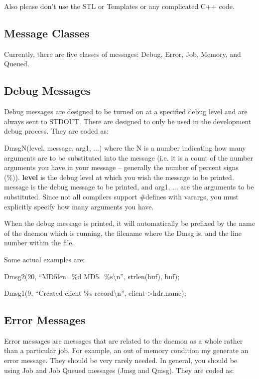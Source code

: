 Also please don't use the STL or Templates or any complicated C++ code. 

\subsection{Message Classes}

Currently, there are five classes of messages: Debug, Error, Job, Memory, 
and Queued.

\subsection{Debug Messages}

Debug messages are designed to be turned on at a specified debug level and are
always sent to STDOUT. There are designed to only be used in the development
debug process. They are coded as: 

DmsgN(level, message, arg1, ...) where the N is a number indicating how many
arguments are to be substituted into the message (i.e. it is a count of the
number arguments you have in your message -- generally the number of percent
signs (\%)). {\bf level} is the debug level at which you wish the message to
be printed. message is the debug message to be printed, and arg1, ... are the
arguments to be substituted. Since not all compilers support \#defines with
varargs, you must explicitly specify how many arguments you have. 

When the debug message is printed, it will automatically be prefixed by the
name of the daemon which is running, the filename where the Dmsg is, and the
line number within the file. 

Some actual examples are: 

Dmsg2(20, ``MD5len=\%d MD5=\%s\textbackslash{}n'', strlen(buf), buf); 

Dmsg1(9, ``Created client \%s record\textbackslash{}n'', client->hdr.name); 

\subsection{Error Messages}

Error messages are messages that are related to the daemon as a whole rather
than a particular job. For example, an out of memory condition my generate an
error message. They should be very rarely needed. In general, you should be
using Job and Job Queued messages (Jmsg and Qmsg). They are coded as: 

